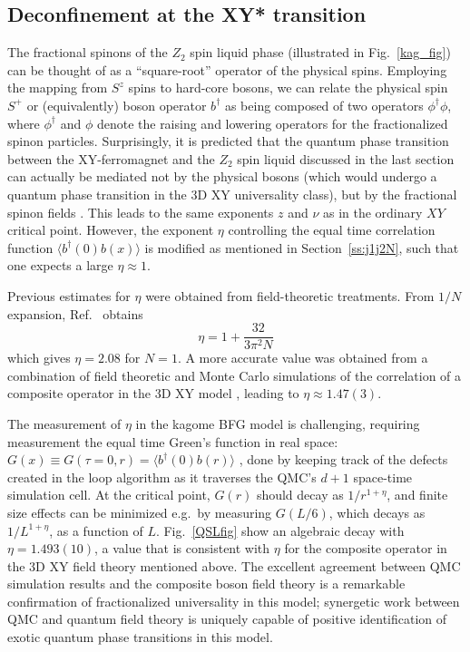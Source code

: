 \documentclass[range]{ar2e}
\begin{document}
\subsection{Deconfinement at the XY* transition} \label{XYstar}

The fractional spinons of the $Z_2$ spin liquid phase (illustrated in Fig.~\ref{kag_fig}) can be thought of as a ``square-root'' operator of the physical spins.  Employing the mapping from $S^z$ spins to hard-core bosons, we can relate the physical spin $S^+$ or (equivalently) boson operator $b^{\dagger}$ as being composed of two operators  $\phi^\dagger \phi$, where $\phi^\dagger$ and $\phi$ denote the raising and lowering operators for the fractionalized spinon particles.  
Surprisingly, it is predicted that the quantum phase transition between the XY-ferromagnet and the $Z_2$ spin liquid discussed in the last section can actually be mediated not by the physical bosons (which would undergo a quantum phase transition in the 3D XY universality class), but by the fractional spinon fields \cite{XYstar1,XYstar2,earlyXYstar}.  This leads to the same exponents $z$ and $\nu$ as in the ordinary $XY$ critical point.  However, the exponent $\eta$ controlling the equal time correlation function $\langle b^\dagger(0) b(x) \rangle$ is modified as mentioned in Section~\ref{ss:j1j2N}, such that one expects a large $\eta \approx 1$.

Previous estimates for $\eta$ were obtained from field-theoretic treatments.  From $1/N$ expansion, Ref.~\cite{XYstar2} obtains
\begin{equation}
\eta = 1 + \frac{32}{3 \pi^2 N}
\end{equation}
which gives $\eta = 2.08$ for $N=1$.
A more accurate value was obtained from a combination of field theoretic and Monte Carlo simulations of the correlation of a composite operator in the 3D XY model \cite{compositefieldtheory,compositeMC}, leading to $\eta\approx  1.47(3)$.

The measurement of $\eta$ in the kagome BFG model is challenging, requiring measurement the equal time Green's function in real space: $G(x)\equiv G(\tau=0,r) = \langle b^\dagger(0) b(r) \rangle$ \cite{WormA,gfsse}, done by keeping track of the defects created in the loop algorithm \cite{Syljuasen02} as it traverses the QMC's $d+1$ space-time simulation cell.  At the critical point, $G(r)$ should decay as $1/r^{1+\eta}$, and finite size effects can be minimized e.g.~by measuring $G(L/6)$, which decays as $1/L^{1+\eta}$, as a function of $L$.  Fig.~\ref{QSLfig} show an algebraic decay with $\eta=1.493(10)$, a value that is consistent with $\eta$ for the composite operator in the 3D XY field theory mentioned above.  The excellent agreement between QMC simulation results and the composite boson field theory is a remarkable confirmation of fractionalized universality in this model; synergetic work between QMC and quantum field theory is uniquely capable of positive identification of exotic quantum phase transitions in this model.
\end{document}
